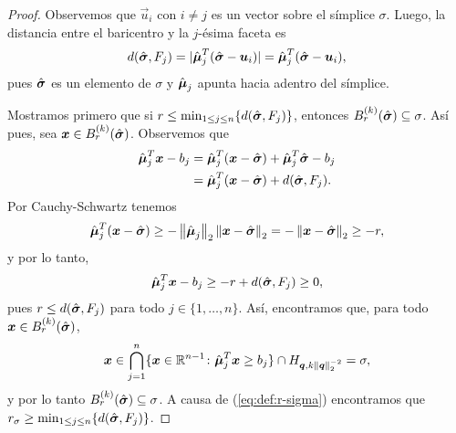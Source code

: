 \begin{proof}
	Observemos que $\vec{u}_i$ con $i \neq j$ es un vector sobre el símplice $\sigma$. Luego, la
	distancia entre el baricentro y la $j$-ésima faceta es
	\begin{equation*}
		d(\hat{\boldsymbol{ \sigma }}, F_j) = |\hat{\boldsymbol{ \mu }}_j^T(\hat{\boldsymbol{ \sigma }} - \boldsymbol{u}_i)|
		= \hat{\boldsymbol{ \mu }}_j^T(\hat{\boldsymbol{ \sigma }} - \boldsymbol{u}_i),
	\end{equation*}
	pues $\hat{\boldsymbol{ \sigma }}$ es un elemento de $\sigma$ y $\hat{\boldsymbol{ \mu }}_j$ apunta hacia adentro
	del símplice.

	Mostramos primero que si $r \leq \min_{1 \leq j \leq n} \lbrace d(\hat{\boldsymbol{ \sigma }}, F_j) \rbrace$, entonces
	$B_r^{(k)}(\hat{\boldsymbol{ \sigma }}) \subseteq \sigma$. Así pues, sea $\boldsymbol{x} \in
	B_r^{(k)}(\hat{\boldsymbol{ \sigma }})$. Observemos que
	\begin{align*}
		\hat{\boldsymbol{ \mu }}_j^T\boldsymbol{x} - b_j
		&=
		\hat{\boldsymbol{ \mu }}_j^T(\boldsymbol{x} - \hat{\boldsymbol{ \sigma }}) + \hat{\boldsymbol{ \mu }}_j^T\hat{\boldsymbol{ \sigma }} -
		b_j \\
		&= \hat{\boldsymbol{ \mu }}_j^T(\boldsymbol{x} - \hat{\boldsymbol{ \sigma }}) + d(\hat{\boldsymbol{ \sigma }}, F_j).
	\end{align*}
	Por Cauchy-Schwartz tenemos
	\begin{equation*}
		\hat{\boldsymbol{ \mu }}_j^T(\boldsymbol{x} - \hat{\boldsymbol{ \sigma }}) \geq -\left\lVert \hat{\boldsymbol{ \mu }}_j \right\rVert_2\left\lVert \boldsymbol{x} -
		\hat{\boldsymbol{ \sigma }} \right\rVert_2 = -\left\lVert \boldsymbol{x} - \hat{\boldsymbol{ \sigma }} \right\rVert_2 \geq -r,
	\end{equation*}
	y por lo tanto,
	\begin{equation*}
		\hat{\boldsymbol{ \mu }}_j^T\boldsymbol{x} - b_j \geq -r + d(\hat{\boldsymbol{ \sigma }}, F_j) \geq 0,
	\end{equation*}
	pues $r \leq d(\hat{\boldsymbol{ \sigma }}, F_j)$ para todo $j \in \lbrace 1, \ldots, n \rbrace$. Así,
	encontramos que, para todo $\boldsymbol{x} \in B_r^{(k)}(\hat{\boldsymbol{ \sigma }})$,
	\begin{equation*}
		\boldsymbol{x} \in
		\bigcap_{j=1}^{n} \lbrace \boldsymbol{x} \in \mathbb{R}^{n-1} \colon \hat{\boldsymbol{ \mu }}^T_j\boldsymbol{x} \geq b_j \rbrace
		\cap H_{\boldsymbol{q}, k\left\lVert \boldsymbol{q} \right\rVert_2^{-2}} = \sigma,
	\end{equation*}
	y por lo tanto $B_r^{(k)}(\hat{\boldsymbol{ \sigma }}) \subseteq \sigma$. A causa de
	(\ref{eq:def:r-sigma}) encontramos que $r_\sigma \geq \min_{1 \leq j \leq n} \lbrace
	d(\hat{\boldsymbol{ \sigma }}, F_j) \rbrace$.


\end{proof}

